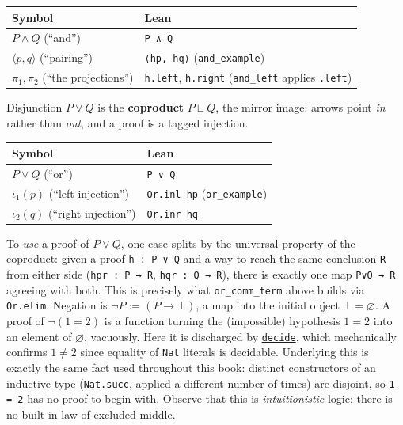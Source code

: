 \begin{longtable}[]{@{}
  >{\raggedright\arraybackslash}p{}
  >{\raggedright\arraybackslash}p{}@{}}
\toprule\noalign{}
\begin{minipage}[b]{\linewidth}\raggedright
Symbol
\end{minipage} & \begin{minipage}[b]{\linewidth}\raggedright
Lean
\end{minipage} \\
\midrule\noalign{}
\endhead
\bottomrule\noalign{}
\endlastfoot
\(P \wedge Q\) (``and'') & \texttt{P ∧ Q} \\
\(\langle p, q \rangle\) (``pairing'') & \texttt{⟨hp, hq⟩} (\texttt{and\_\allowbreak{}example}) \\
\(\pi_1, \pi_2\) (``the projections'') & \texttt{h.left}, \texttt{h.right} (\texttt{and\_\allowbreak{}left} applies \texttt{.left}) \\
\end{longtable}

Disjunction \(P \vee Q\) is the \textbf{coproduct} \(P \sqcup Q\), the mirror image: arrows point \emph{in} rather than \emph{out}, and a proof is a tagged injection.

\begin{center}

\end{center}

\begin{longtable}[]{@{}ll@{}}
\toprule\noalign{}
Symbol & Lean \\
\midrule\noalign{}
\endhead
\bottomrule\noalign{}
\endlastfoot
\(P \vee Q\) (``or'') & \texttt{P ∨ Q} \\
\(\iota_1(p)\) (``left injection'') & \texttt{Or.inl hp} (\texttt{or\_\allowbreak{}example}) \\
\(\iota_2(q)\) (``right injection'') & \texttt{Or.inr hq} \\
\end{longtable}

To \emph{use} a proof of \(P \vee Q\), one case-splits by the universal property of the coproduct: given a proof \texttt{h : P ∨ Q} and a way to reach the same conclusion \texttt{R} from either side (\texttt{hpr : P → R}, \texttt{hqr : Q → R}), there is exactly one map \texttt{P∨Q → R} agreeing with both. This is precisely what \texttt{or\_\allowbreak{}comm\_\allowbreak{}term} above builds via \texttt{Or.elim}. Negation is \(\neg P := (P \to
\bot)\), a map into the initial object \(\bot = \varnothing\). A proof of \(\neg(1=2)\) is a function turning the (impossible) hypothesis \(1 = 2\) into an element of \(\varnothing\), vacuously. Here it is discharged by \href{https://lean-lang.org/doc/reference/latest/Tactic-Proofs/Tactic-Reference/}{\texttt{decide}}, which mechanically confirms \(1 \neq 2\) since equality of \texttt{Nat} literals is decidable. Underlying this is exactly the same fact used throughout this book: distinct constructors of an inductive type (\texttt{Nat.succ}, applied a different number of times) are disjoint, so \texttt{1 = 2} has no proof to begin with. Observe that this is \emph{intuitionistic} logic: there is no built-in law of excluded middle.
